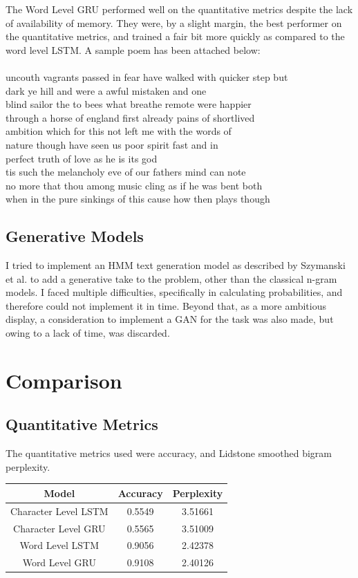 \documentclass[15pt]{article}
\begin{document}
The Word Level GRU performed well on the quantitative metrics despite the lack of availability of memory. They were, by a slight margin, the best performer on the quantitative metrics, and trained a fair bit more quickly as compared to the word level LSTM. A sample poem has been attached below:\\\\
uncouth vagrants passed in fear have walked with quicker step but\\
dark ye hill and were a awful mistaken and one \\
 blind sailor the to bees what breathe remote were happier \\
 through a horse of england first already pains of shortlived \\
 ambition which for this not left me with the words of \\
 nature though have seen us poor spirit fast and in \\
 perfect truth of love as he is its god \\
 tis such the melancholy eve of our fathers mind can note \\
 no more that thou among music cling as if he was bent both \\
 when in the pure sinkings of this cause how then plays though\\


\subsection{Generative Models}
I tried to implement an HMM text generation model as described by Szymanski et al. to add a generative take to the problem, other than the classical n-gram models. I faced multiple difficulties, specifically in calculating probabilities, and therefore could not implement it in time. Beyond that, as a more ambitious display, a consideration to implement a GAN for the task was also made, but owing to a lack of time, was discarded.

\section{Comparison}
\subsection*{Quantitative Metrics}
The quantitative metrics used were accuracy, and Lidstone smoothed bigram perplexity.
\begin{center}
 \begin{tabular}{||c c c||} 
 \hline
 Model & Accuracy & Perplexity \\ [0.5ex] 
 \hline\hline
 Character Level LSTM & 0.5549 & 3.51661 \\ 
 \hline
 Character Level GRU & 0.5565 & 3.51009 \\
 \hline
 Word Level LSTM & 0.9056 & 2.42378 \\
 \hline
 Word Level GRU & 0.9108 & 2.40126 \\ [1ex] 
 \hline
\end{tabular}
\end{center}
\end{document}
